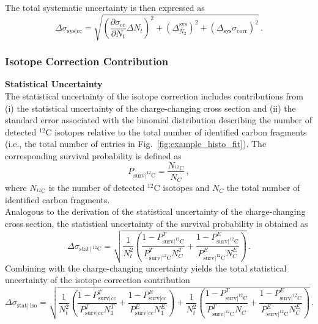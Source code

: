 The total systematic uncertainty is then expressed as
\begin{equation}
\Delta\sigma_{\text{sys}|\text{cc}} = \sqrt{ \left( \frac{\partial \sigma_{\text{cc}}}{\partial N_t} \Delta N_t \right)^2 + \left( \Delta^{\text{sys}}_{N_2} \right)^2 + \left( \Delta_{\text{sys}}\sigma_{\text{corr}} \right)^2 } \, .
\end{equation}

\subsubsection{Isotope Correction Contribution}\label{sec:iso_corr}

\textbf{Statistical Uncertainty} \\
The statistical uncertainty of the isotope correction includes contributions from (i) the statistical uncertainty of the charge-changing cross section and (ii) the standard error associated with the binomial distribution describing the number of detected $^{12}$C isotopes relative to the total number of identified carbon fragments (i.e., the total number of entries in Fig.~\ref{fig:example_histo_fit}). The corresponding survival probability is defined as
\begin{equation}
P_{\text{surv}|^{12}\mathrm{C}} = \frac{N_{^{12}\mathrm{C}}}{N_C} \, ,
\end{equation}
where $N_{^{12}\mathrm{C}}$ is the number of detected $^{12}$C isotopes and $N_C$ the total number of identified carbon fragments.\\
Analogous to the derivation of the statistical uncertainty of the charge-changing cross section, the statistical uncertainty of the survival probability is obtained as
\begin{equation}
\Delta\sigma_{\text{stat}|\:^{12}\mathrm{C}} = \sqrt{ \frac{1}{N_t^2} \left( \frac{1 - P^{T}_{\text{surv}|^{12}\mathrm{C}}}{P^{T}_{\text{surv}|^{12}\mathrm{C}} N^{T}_C} + \frac{1 - P^{E}_{\text{surv}|^{12}\mathrm{C}}}{P^{E}_{\text{surv}|^{12}\mathrm{C}} N^{E}_C} \right) } \, .
\end{equation}
Combining with the charge-changing uncertainty yields the total statistical uncertainty of the isotope correction contribution
\begin{equation}
\Delta\sigma_{\text{stat}|\:\text{iso}} = \sqrt{ \frac{1}{N_t^2} \left( \frac{1 - P^{T}_{\text{surv}|cc}}{P^{T}_{\text{surv}|cc} N^{T}_1} + \frac{1 - P^{E}_{\text{surv}|cc}}{P^{E}_{\text{surv}|cc} N_1^E} \right) + \frac{1}{N_t^2} \left( \frac{1 - P^{T}_{\text{surv}|^{12}\mathrm{C}}}{P^{T}_{\text{surv}|^{12}\mathrm{C}} N_C} + \frac{1 - P^{E}_{\text{surv}|^{12}\mathrm{C}}}{P^{E}_{\text{surv}|^{12}\mathrm{C}} N^{E}_C} \right) } \, .
\end{equation}

